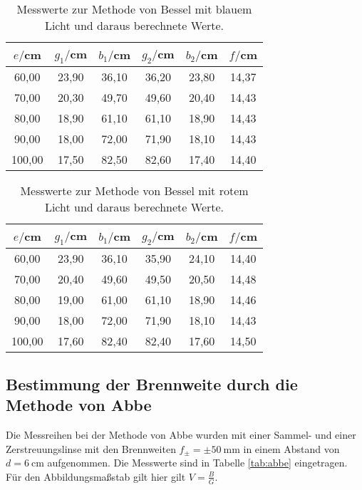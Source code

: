 \begin{table}[htp]
	\begin{center}
    \caption{Messwerte zur Methode von Bessel mit blauem Licht und daraus berechnete Werte.}
    \label{tab:besselblau}
		\begin{tabular}{cccccc}
		\toprule
			{$e/$cm} & {$g_1/$cm} & {$b_1/$cm} & {$g_2/$cm} & {$b_2/$cm} & {$f/$cm}\\
			\midrule
			60,00 & 23,90 & 36,10 & 36,20 & 23,80 & 14,37\\
			70,00 & 20,30 & 49,70 & 49,60 & 20,40 & 14,43\\
			80,00 & 18,90 & 61,10 & 61,10 & 18,90 & 14,43\\
			90,00 & 18,00 & 72,00 & 71,90 & 18,10 & 14,43\\
		  100,00 & 17,50 & 82,50 & 82,60 & 17,40 & 14,40\\
		\bottomrule
		\end{tabular}
	\end{center}
\end{table}

\begin{table}[htp]
	\begin{center}
    \caption{Messwerte zur Methode von Bessel mit rotem Licht und daraus berechnete Werte.}
    \label{tab:besselrot}
		\begin{tabular}{cccccc}
		\toprule
			{$e/$cm} & {$g_1/$cm} & {$b_1/$cm} & {$g_2/$cm} & {$b_2/$cm} & {$f/$cm}\\
			\midrule
			60,00 & 23,90 & 36,10 & 35,90 & 24,10 & 14,40\\
			70,00 & 20,40 & 49,60 & 49,50 & 20,50 & 14,48\\
			80,00 & 19,00 & 61,00 & 61,10 & 18,90 & 14,46\\
			90,00 & 18,00 & 72,00 & 71,90 & 18,10 & 14,43\\
			100,00 & 17,60 & 82,40 & 82,40 & 17,60 & 14,50\\
		\bottomrule
		\end{tabular}
	\end{center}
\end{table}

 \newpage
\subsection{Bestimmung der Brennweite durch die Methode von Abbe}
Die Messreihen bei der Methode von Abbe wurden mit einer Sammel- und einer
Zerstreuungslinse mit den Brennweiten $f_{\pm} = \pm \SI{50}{\mm}$ in
einem Abstand von $d=\SI{6}{\centi\meter}$ aufgenommen.
Die Messwerte sind in Tabelle \ref{tab:abbe} eingetragen. Für den Abbildungsmaßstab gilt
hier gilt $V=\frac{B}{G}$.

